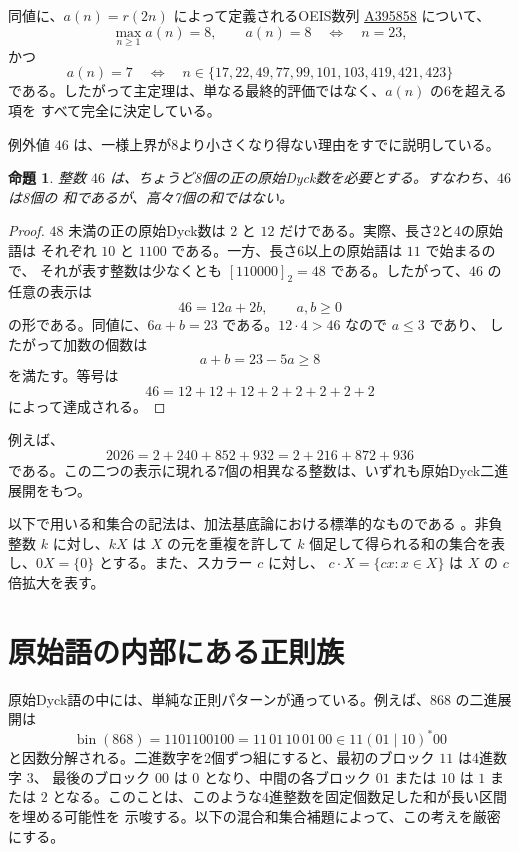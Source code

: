 \documentclass[12pt]{ltjsarticle}
\theoremstyle{plain}
\newtheorem{proposition}[theorem]{命題}
\newcommand{\seqnum}[1]{\href{https://oeis.org/#1}{\rm \underline{#1}}}
\begin{document}
同値に、$a(n)=r(2n)$ によって定義されるOEIS数列
\seqnum{A395858} \cite{OEIS-A395858} について、
\[
        \max_{n\geq1}a(n)=8,
        \qquad
        a(n)=8\quad\Longleftrightarrow\quad n=23,
\]
かつ
\[
 a(n)=7
 \quad\Longleftrightarrow\quad
 n\in\{17,22,49,77,99,101,103,419,421,423\}
\]
である。したがって主定理は、単なる最終的評価ではなく、$a(n)$ の6を超える項を
すべて完全に決定している。

例外値 $46$ は、一様上界が8より小さくなり得ない理由をすでに説明している。

\begin{proposition}\label{prop:46}
整数 $46$ は、ちょうど8個の正の原始Dyck数を必要とする。すなわち、$46$ は8個の
和であるが、高々7個の和ではない。
\end{proposition}

\begin{proof}
$48$ 未満の正の原始Dyck数は $2$ と $12$ だけである。実際、長さ2と4の原始語は
それぞれ $10$ と $1100$ である。一方、長さ6以上の原始語は $11$ で始まるので、
それが表す整数は少なくとも $[110000]_2=48$ である。したがって、$46$ の任意の表示は
\[
        46=12a+2b,
        \qquad a,b\geq0
\]
の形である。同値に、$6a+b=23$ である。$12\cdot4>46$ なので $a\leq3$ であり、
したがって加数の個数は
\[
        a+b=23-5a\geq8
\]
を満たす。等号は
\[
        46=12+12+12+2+2+2+2+2
\]
によって達成される。
\end{proof}

例えば、
\[
 2026=2+240+852+932=2+216+872+936
\]
である。この二つの表示に現れる7個の相異なる整数は、いずれも原始Dyck二進展開をもつ。

以下で用いる和集合の記法は、加法基底論における標準的なものである
\cite[Chap.\ 1]{Nathanson}。非負整数 $k$ に対し、$kX$ は $X$ の元を重複を許して
$k$ 個足して得られる和の集合を表し、$0X=\{0\}$ とする。また、スカラー $c$ に対し、
$c\cdot X=\{cx:x\in X\}$ は $X$ の $c$ 倍拡大を表す。


\section{原始語の内部にある正則族}

原始Dyck語の中には、単純な正則パターンが通っている。例えば、$868$ の二進展開は
\[
 \operatorname{bin}(868)=1101100100=11\,01\,10\,01\,00
 \in 11(01\mid10)^*00
\]
と因数分解される。二進数字を2個ずつ組にすると、最初のブロック $11$ は4進数字 $3$、
最後のブロック $00$ は $0$ となり、中間の各ブロック $01$ または $10$ は $1$ または
$2$ となる。このことは、このような4進整数を固定個数足した和が長い区間を埋める可能性を
示唆する。以下の混合和集合補題によって、この考えを厳密にする。
\end{document}

